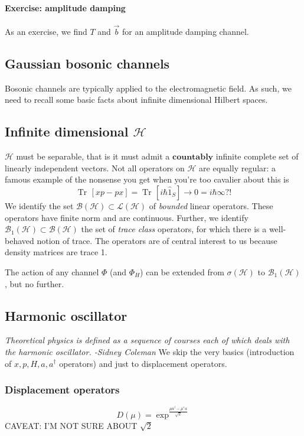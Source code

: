 \documentclass[a4paper, 11pt]{article}
\newcommand{\Tr}{\mathop{\mathrm{Tr}\!}{}}
\newcommand{\HH}{\mathcal{H}}
\begin{document}
	\paragraph{Exercise: amplitude damping} As an exercise, we find $T$ and $\vec{b}$ for an amplitude damping channel.
	
	\subsection{Gaussian bosonic channels}
	Bosonic channels are typically applied to the electromagnetic field. As such, we need to recall some basic facts about infinite dimensional Hilbert spaces.
	\subsection{Infinite dimensional $\HH$}
	$\HH$ must be separable, that is it must admit a $\mathbf{countably}$ infinite complete set of linearly independent vectors.
	Not all operators on $\HH$ are equally regular: a famous example of the nonsense you get when you're too cavalier about this is
	\[ \Tr\left[ xp - px \right] = \Tr\left[ i\hbar \hat{1}_S \right] \rightarrow 0 = i\hbar\infty?! \]
	We identify the set $\mathcal{B}(\HH) \subset \mathcal{L}(\HH)$ of \emph{bounded} linear operators. These operators have finite norm and are continuous. Further, we identify $\mathcal{B}_1(\HH) \subset \mathcal{B}(\HH)$ the set of \emph{trace class} operators, for which there is a well-behaved notion of trace. The operators are of central interest to us because density matrices are trace 1.
	
	The action of any channel $\Phi$ (and $\Phi_H$) can be extended from $\sigma(\HH)$ to $\mathcal{B}_1(\HH)$, but no further.
	
	\subsection{Harmonic oscillator}
	\emph{Theoretical physics is defined as a sequence of courses each of which deals with the harmonic oscillator. -Sidney Coleman}
	We skip the very basics (introduction of $x,p,H,a,a^\dagger$ operators) and just to displacement operators.
	\subsubsection{Displacement operators}
	\label{subsub:disp.op.}
	\[ D(\mu) = \exp^{\frac{\mu a^\dagger - \mu^* a}{\sqrt{2}}} \]
	CAVEAT: I'M NOT SURE ABOUT $\sqrt{2}$
	
\end{document}
